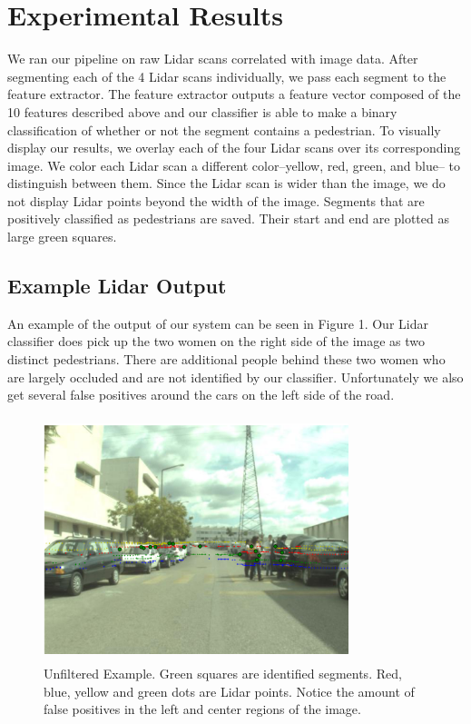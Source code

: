 \documentclass[10pt,twocolumn,letterpaper]{article}
\begin{document}
\section{Experimental Results}
  We ran our pipeline on raw Lidar scans correlated with image data. After
  segmenting each of the 4 Lidar scans individually, we pass each segment to the
  feature extractor. The feature extractor outputs a feature vector composed of
  the 10 features described above and our classifier is able to make a binary
  classification of whether or not the segment contains a pedestrian. To visually
  display our results, we overlay each of the four Lidar scans over its corresponding
  image. We color each Lidar scan a different color--yellow, red, green, and blue--
  to distinguish between them. Since the Lidar scan is wider than the image,
  we do not display Lidar points beyond the width of the image. Segments that are
  positively classified as pedestrians are saved. Their start and end are plotted
  as large green squares.


  \subsection{Example Lidar Output}
  An example of the output of our system can be seen in Figure 1. Our Lidar
  classifier does pick up the two women on the right side of the image as two
  distinct pedestrians. There are additional people behind these two women
  who are largely occluded and are not identified by our classifier. Unfortunately
  we also get several false positives around the cars on the left side of the road.

  \begin{figure}
    \includegraphics[height=2.8in, width=3.5in]{images/filterSampleOriginal.png}
    \caption{ Unfiltered Example. Green squares are identified
    segments. Red, blue, yellow and green dots are Lidar points. Notice the
    amount of false positives in the left and center regions of the image.}
  \end{figure}
\end{document}

